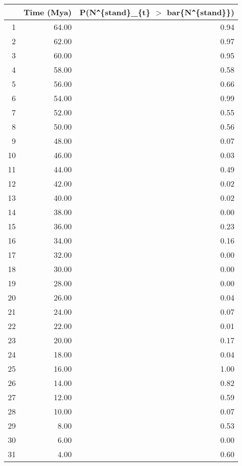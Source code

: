 \begin{table}[ht]
\centering
\begin{tabular}{rrr}
  \hline
 & Time (Mya) & P(N\verb|^|\{stand\}\_\{t\} $>$ bar\{N\verb|^|\{stand\}\}) \\ 
  \hline
1 & 64.00 & 0.94 \\ 
  2 & 62.00 & 0.97 \\ 
  3 & 60.00 & 0.95 \\ 
  4 & 58.00 & 0.58 \\ 
  5 & 56.00 & 0.66 \\ 
  6 & 54.00 & 0.99 \\ 
  7 & 52.00 & 0.55 \\ 
  8 & 50.00 & 0.56 \\ 
  9 & 48.00 & 0.07 \\ 
  10 & 46.00 & 0.03 \\ 
  11 & 44.00 & 0.49 \\ 
  12 & 42.00 & 0.02 \\ 
  13 & 40.00 & 0.02 \\ 
  14 & 38.00 & 0.00 \\ 
  15 & 36.00 & 0.23 \\ 
  16 & 34.00 & 0.16 \\ 
  17 & 32.00 & 0.00 \\ 
  18 & 30.00 & 0.00 \\ 
  19 & 28.00 & 0.00 \\ 
  20 & 26.00 & 0.04 \\ 
  21 & 24.00 & 0.07 \\ 
  22 & 22.00 & 0.01 \\ 
  23 & 20.00 & 0.17 \\ 
  24 & 18.00 & 0.04 \\ 
  25 & 16.00 & 1.00 \\ 
  26 & 14.00 & 0.82 \\ 
  27 & 12.00 & 0.59 \\ 
  28 & 10.00 & 0.07 \\ 
  29 & 8.00 & 0.53 \\ 
  30 & 6.00 & 0.00 \\ 
  31 & 4.00 & 0.60 \\ 
   \hline
\end{tabular}
\label{tab:div_peak}
\end{table}

